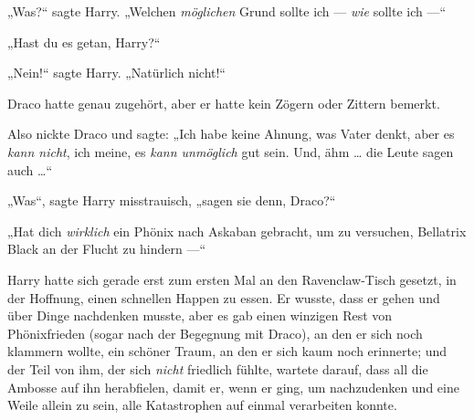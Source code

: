 „Was?“ sagte Harry.
„Welchen \emph{möglichen} Grund sollte ich — \emph{wie} sollte ich —“

„Hast du es getan, Harry?“

„Nein!“ sagte Harry.
„Natürlich nicht!“

Draco hatte genau zugehört, aber er hatte kein Zögern oder Zittern bemerkt.

Also nickte Draco und sagte:
„Ich habe keine Ahnung, was Vater denkt, aber es \emph{kann nicht}, ich meine, es \emph{kann unmöglich} gut sein. Und, ähm … die Leute sagen auch …“

„Was“, sagte Harry misstrauisch, „sagen sie denn, Draco?“

„Hat dich \emph{wirklich} ein Phönix nach Askaban gebracht, um zu versuchen, Bellatrix Black an der Flucht zu hindern —“


Harry hatte sich gerade erst zum ersten Mal an den Ravenclaw-Tisch gesetzt, in der Hoffnung, einen schnellen Happen zu essen. Er wusste, dass er gehen und über Dinge nachdenken musste, aber es gab einen winzigen Rest von Phönixfrieden (sogar nach der Begegnung mit Draco), an den er sich noch klammern wollte, ein schöner Traum, an den er sich kaum noch erinnerte; und der Teil von ihm, der sich \emph{nicht} friedlich fühlte, wartete darauf, dass all die Ambosse auf ihn herabfielen, damit er, wenn er ging, um nachzudenken und eine Weile allein zu sein, alle Katastrophen auf einmal verarbeiten konnte.


